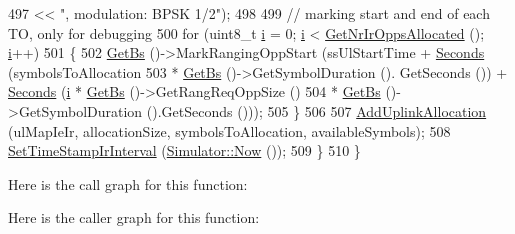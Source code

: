 \begin{DoxyCode}
497                                                                               << \textcolor{stringliteral}{", modulation: BPSK 1/2"});
498 
499       \textcolor{comment}{// marking start and end of each TO, only for debugging}
500       \textcolor{keywordflow}{for} (uint8\_t \hyperlink{bernuolliDistribution_8m_a6f6ccfcf58b31cb6412107d9d5281426}{i} = 0; \hyperlink{bernuolliDistribution_8m_a6f6ccfcf58b31cb6412107d9d5281426}{i} < \hyperlink{classns3_1_1UplinkScheduler_a9a2cbb04c1e84a028fc1545e8f054b80}{GetNrIrOppsAllocated} (); \hyperlink{bernuolliDistribution_8m_a6f6ccfcf58b31cb6412107d9d5281426}{i}++)
501         \{
502           \hyperlink{classns3_1_1UplinkScheduler_afe61b7de71d92d2dff1b135744a6ff7e}{GetBs} ()->MarkRangingOppStart (ssUlStartTime + \hyperlink{group__timecivil_ga33c34b816f8ff6628e33d5c8e9713b9e}{Seconds} (symbolsToAllocation
503                                                                   * \hyperlink{classns3_1_1UplinkScheduler_afe61b7de71d92d2dff1b135744a6ff7e}{GetBs} ()->GetSymbolDuration ().
      GetSeconds ()) + \hyperlink{group__timecivil_ga33c34b816f8ff6628e33d5c8e9713b9e}{Seconds} (\hyperlink{bernuolliDistribution_8m_a6f6ccfcf58b31cb6412107d9d5281426}{i} * \hyperlink{classns3_1_1UplinkScheduler_afe61b7de71d92d2dff1b135744a6ff7e}{GetBs} ()->GetRangReqOppSize ()
504                                                                                                            
                        * \hyperlink{classns3_1_1UplinkScheduler_afe61b7de71d92d2dff1b135744a6ff7e}{GetBs} ()->GetSymbolDuration ().GetSeconds ()));
505         \}
506 
507       \hyperlink{classns3_1_1UplinkSchedulerSimple_a078c18f311ce90cbceab11a54cd4606e}{AddUplinkAllocation} (ulMapIeIr, allocationSize, symbolsToAllocation, 
      availableSymbols);
508       \hyperlink{classns3_1_1UplinkScheduler_ad6e89aef6cf4a9d485762f8bd08ec24e}{SetTimeStampIrInterval} (\hyperlink{classns3_1_1Simulator_ac3178fa975b419f7875e7105be122800}{Simulator::Now} ());
509     \}
510 \}
\end{DoxyCode}


Here is the call graph for this function\+:




Here is the caller graph for this function\+:



